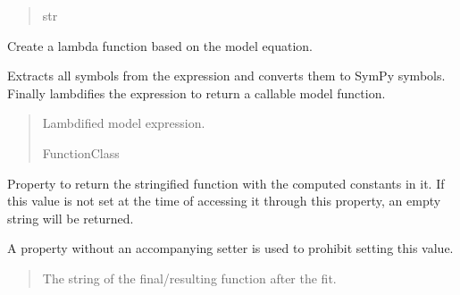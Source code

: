 \documentclass[letterpaper,10pt,english]{sphinxmanual}
\begin{document}
\begin{fulllineitems}
\begin{fulllineitems}
\begin{quote}
\begin{description}
\sphinxAtStartPar
str

\end{description}\end{quote}

\end{fulllineitems}


\begin{fulllineitems}
\label{\detokenize{VPCModel:src.VPCModel.VPCModel.model_string_to_function}}
\pysigstartsignatures
{}
\pysigstopsignatures
\sphinxAtStartPar
Create a lambda function based on the model equation.

\sphinxAtStartPar
Extracts all symbols from the expression and converts them to SymPy symbols.
Finally lambdifies the expression to return a callable model function.
\begin{quote}\begin{description}
\sphinxAtStartPar
Lambdified model expression.

\sphinxAtStartPar
FunctionClass

\end{description}\end{quote}

\end{fulllineitems}


\begin{fulllineitems}
\label{\detokenize{VPCModel:src.VPCModel.VPCModel.resulting_function}}
\pysigstartsignatures
{}
\pysigstopsignatures
\sphinxAtStartPar
Property to return the stringified function with the computed constants in it.
If this value is not set at the time of accessing it through this property,
an empty string will be returned.

\sphinxAtStartPar
A property without an accompanying setter is used to prohibit setting this value.
\begin{quote}\begin{description}
\sphinxAtStartPar
The string of the final/resulting function after the fit.


\end{description}
\end{quote}
\end{fulllineitems}
\end{fulllineitems}
\end{document}
